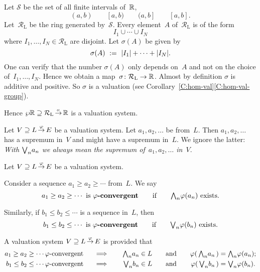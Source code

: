 \documentclass[main.tex]{subfiles}
\begin{document}
\begin{ex}
Let $\mathcal{S}$ be the set of all finite intervals of~$\mathbb{R}$,
\begin{equation*}
(a,b)\qquad [a,b)\qquad (a,b]\qquad [a,b].
\end{equation*}
Let~$\mathcal{R}_\mathrm{L}$ be the ring generated by~$\mathcal{S}$.
Every element~$A$ of~$\mathcal{R}_\mathrm{L}$ is of the form
\begin{equation*}
I_1 \cup \dotsb \cup I_N
\end{equation*}
where $I_1,\dotsc,I_N\in \mathcal{R}_\mathrm{L}$
are disjoint.
Let $\sigma(A)$ be given by
\begin{equation*}
\sigma(A) \ :=\  |I_1| + \dotsb + |I_N|.
\end{equation*}
One can verify that the number $\sigma(A)$
only depends on~$A$ and not on the choice of~$I_1,\dotsc,I_N$.
Hence we obtain a map~$\sigma\colon \mathcal{R}_\mathrm{L} \rightarrow \mathbb{R}$.
Almost by definition $\sigma$ is additive and positive.
So $\sigma$ is a valuation 
(see Corollary~\ref{C:hom-val}\ref{C:hom-val-group}).

Hence $\wp \mathbb{R} \supseteq \mathcal{R}_\mathrm{L}\,\smash{\stackrel{\sigma}{\rightarrow}}\,\mathbb{R}$
is a valuation system.
\end{ex}

\begin{nt}
Let $V \supseteq L\,\smash{\stackrel{\varphi}{\rightarrow}}\,E$ be a valuation system.
Let $a_1, a_2, \dotsc$ be from~$L$.
Then $a_1, a_2,\dotsc$ has a supremum
in~$V$ and might have a supremum in~$L$.
We ignore the latter:
\emph{With $\textstyle{\bigvee}_n a_n$
we always mean the supremum of~$a_1, a_2,\dotsc $ in~$V$}.
\end{nt}
%
%
\begin{dfn}
Let $V \supseteq L\,\smash{\stackrel{\varphi}{\rightarrow}}\,E$ be a valuation system.

Consider a sequence
$a_1 \geq a_2 \geq \dotsb$ from~$L$.
We say
\begin{equation*}
a_1 \geq a_2 \geq \dotsb \text{ is \textbf{$\varphi$-convergent}}
\qquad\text{if}\qquad \textstyle{\bigwedge}_n \varphi(a_n)\text{ exists.}
\end{equation*}

Similarly,
if
$b_1 \leq b_2 \leq \dotsb$ is
a sequence in~$L$, then 
\begin{equation*}
b_1 \leq b_2 \leq \dotsb \text{ is \textbf{$\varphi$-convergent}}
\qquad\text{if}\qquad \textstyle{\bigvee}_n \varphi(b_n)\text{ exists.}
\end{equation*}
\end{dfn}
\begin{dfn}
A valuation system $V \supseteq L\,\smash{\stackrel{\varphi}{\rightarrow}}\,E$ is  provided that
\begin{alignat*}{5}
a_1 \geq a_2 \geq \dotsb \text{$\varphi$-convergent }
  \quad &\implies \quad 
  & \textstyle{\bigwedge}_n a_n &\in L\quad 
  &&\text{and}\quad
  &\varphi(\,\textstyle{\bigwedge}_n a_n\,) &= \textstyle{\bigwedge}_n \varphi(a_n); \\
b_1 \leq b_2 \leq \dotsb \text{$\varphi$-convergent }
  \quad &\implies \quad 
  & \textstyle{\bigvee}_n b_n &\in L\quad 
  &&\text{and}\quad
  &\varphi(\,\textstyle{\bigvee}_n b_n\,) &= \textstyle{\bigvee}_n \varphi(b_n).
\end{alignat*}
\end{dfn}
\end{document}
